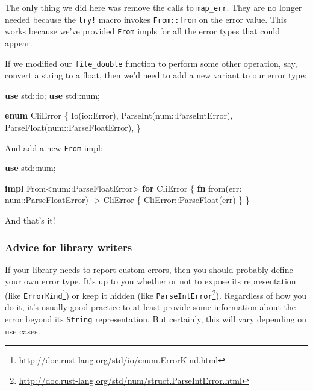 \documentclass[a4paper,]{book}
\renewcommand*{\hypertarget}[3][\ar]{%
  \def\ar{#2}%
  \label{#1}%
  #3}
\newenvironment{Shaded}{\begin{snugshade}}{\end{snugshade}}
\newcommand{\KeywordTok}[1]{\textcolor[rgb]{0.13,0.29,0.53}{\textbf{{#1}}}}
\newcommand{\NormalTok}[1]{{#1}}
\renewcommand{\href}[2]{#2\footnote{\url{#1}}}
\begin{document}
The only thing we did here was remove the calls to \texttt{map\_err}.
They are no longer needed because the \texttt{try!} macro invokes
\texttt{From::from} on the error value. This works because we've
provided \texttt{From} impls for all the error types that could appear.

If we modified our \texttt{file\_double} function to perform some other
operation, say, convert a string to a float, then we'd need to add a new
variant to our error type:

\begin{Shaded}
\begin{Highlighting}[]
\KeywordTok{use} \NormalTok{std::io;}
\KeywordTok{use} \NormalTok{std::num;}

\KeywordTok{enum} \NormalTok{CliError \{}
    \NormalTok{Io(io::Error),}
    \NormalTok{ParseInt(num::ParseIntError),}
    \NormalTok{ParseFloat(num::ParseFloatError),}
\NormalTok{\}}
\end{Highlighting}
\end{Shaded}

And add a new \texttt{From} impl:

\begin{Shaded}
\begin{Highlighting}[]

\KeywordTok{use} \NormalTok{std::num;}

\KeywordTok{impl} \NormalTok{From<num::ParseFloatError> }\KeywordTok{for} \NormalTok{CliError \{}
    \KeywordTok{fn} \NormalTok{from(err: num::ParseFloatError) -> CliError \{}
        \NormalTok{CliError::ParseFloat(err)}
    \NormalTok{\}}
\NormalTok{\}}
\end{Highlighting}
\end{Shaded}

And that's it!

\hypertarget{advice-for-library-writers}{\subsubsection{Advice for
library writers}\label{advice-for-library-writers}}

If your library needs to report custom errors, then you should probably
define your own error type. It's up to you whether or not to expose its
representation (like
\href{http://doc.rust-lang.org/std/io/enum.ErrorKind.html}{\texttt{ErrorKind}})
or keep it hidden (like
\href{http://doc.rust-lang.org/std/num/struct.ParseIntError.html}{\texttt{ParseIntError}}).
Regardless of how you do it, it's usually good practice to at least
provide some information about the error beyond its \texttt{String}
representation. But certainly, this will vary depending on use cases.
\end{document}
